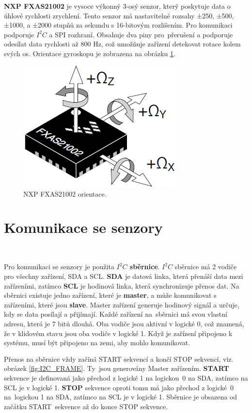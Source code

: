 \textbf{NXP FXAS21002} je vysoce výkonný 3-osý senzor, který poskytuje data o úhlové
rychlosti zrychlení. Tento senzor má nastavitelné rozsahy ±250, ±500, ±1000, a
±2000 stupňů za sekundu s 16-bitovým rozlišením. Pro komunikaci podporuje $I^2C$ a
SPI rozhraní. Obsahuje dva piny pro~přerušení a podporuje odesílat data rychlosti až
800 Hz, což umožňuje zařízení detekovat rotace kolem svých os. Orientace gyroskopu
je zobrazena na obrázku \ref{fig:FXAS_Orientation}\cite{FXAS21002}.

\begin{figure}[!h]
    \centering
    \includegraphics[width = .45\linewidth]{Figures/FXAS_Orientation.png}
    \caption{NXP FXAS21002 orientace\cite{FXAS21002}.}
    \label{fig:FXAS_Orientation}
\end{figure}

\section{Komunikace se senzory}\

Pro komunikaci se senzory je použita \textbf{$I^2C$ sběrnice}. $I^2C$ sběrnice má 2
vodiče pro všechny zařízení, SDA a SCL. \textbf{SDA} je datová linka, která
přenáší data mezi zařízeními, zatímco \textbf{SCL} je hodinová linka, která
synchronizuje přenos dat. Na sběrnici existuje jedno zařízení, které je
\textbf{master}, a může komunikovat s zařízeními, které jsou \textbf{slave}. Master
zařízení generuje hodinový signál a určuje, kdy se data posílají a přijímají. Každé
zařízení na~sběrnici má svou vlastní adresu, která je 7 bitů dlouhá. Oba vodiče jsou
aktivní v logické 0, což znamená, že v klidovém stavu jsou oba vodiče v logické 1.
Když je zařízení připojeno k systému, musí být připojeno na zemi, aby mohlo
komunikovat.

Přenos na sběrnice vždy začíná START sekvencí a končí STOP sekvencí, viz. obrázek
\ref{fig:I2C_FRAME}. Ty~jsou generovány Master zařízením. \textbf{START} sekvence je
definovaná jako přechod z logické 1 na logickou~0 na SDA, zatímco na SCL je v
logické 1. \textbf{STOP} sekvence oproti tomu má jako přechod z logické~0
na~logickou 1 na SDA, zatímco na SCL je v logické 1. Sběrnice je obsazena od začátku
START~sekvence až do konce STOP sekvence.

